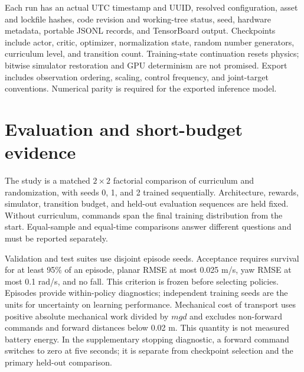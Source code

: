 \documentclass[11pt]{article}
\begin{document}
Each run has an actual UTC timestamp and UUID, resolved configuration, asset and lockfile hashes, code revision and working-tree status, seed, hardware metadata, portable JSONL records, and TensorBoard output. Checkpoints include actor, critic, optimizer, normalization state, random number generators, curriculum level, and transition count. Training-state continuation resets physics; bitwise simulator restoration and GPU determinism are not promised. Export includes observation ordering, scaling, control frequency, and joint-target conventions. Numerical parity is required for the exported inference model.

\section{Evaluation and short-budget evidence}
The study is a matched $2\times2$ factorial comparison of curriculum and randomization, with seeds 0, 1, and 2 trained sequentially. Architecture, rewards, simulator, transition budget, and held-out evaluation sequences are held fixed. Without curriculum, commands span the final training distribution from the start. Equal-sample and equal-time comparisons answer different questions and must be reported separately.

Validation and test suites use disjoint episode seeds. Acceptance requires survival for at least 95\% of an episode, planar RMSE at most 0.025 m/s, yaw RMSE at most 0.1 rad/s, and no fall. This criterion is frozen before selecting policies. Episodes provide within-policy diagnostics; independent training seeds are the units for uncertainty on learning performance. Mechanical cost of transport uses positive absolute mechanical work divided by $mgd$ and excludes non-forward commands and forward distances below 0.02 m. This quantity is not measured battery energy. In the supplementary stopping diagnostic, a forward command switches to zero at five seconds; it is separate from checkpoint selection and the primary held-out comparison.
\end{document}
